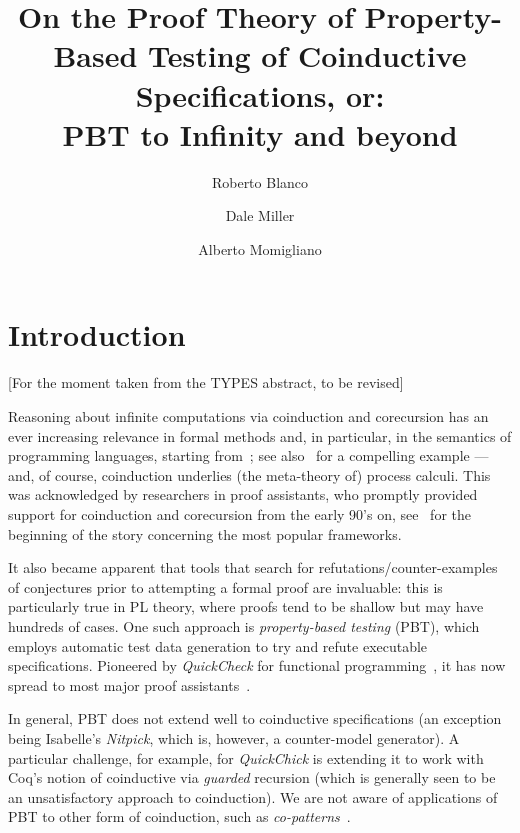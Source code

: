 \documentclass[a4paper]{easychair}
\title{On the Proof Theory of Property-Based Testing of Coinductive Specifications, or:\\
 PBT to Infinity and beyond}
\author{Roberto Blanco\inst{1} \and Dale Miller\inst{2} \and Alberto Momigliano\inst{3}}
\institute{
  INRIA Paris, France
  \and
  INRIA Saclay \& LIX, \'Ecole Polytechnique, France\\
\and
DI, Universit\`a degli Studi di Milano, Italy
}
\begin{document}
\maketitle

\section{Introduction}
\label{sec:intro}

\begin{center}
  [For the moment taken from the TYPES abstract, to be revised]
\end{center}

Reasoning about infinite computations via coinduction and corecursion
has an ever increasing relevance in formal methods and, in particular,
in the semantics of programming languages, starting
from~\cite{milner91tcs}; see also~\cite{2007-Leroy-Grall} for a
compelling example --- and, of course, coinduction underlies (the
meta-theory of) process calculi. This was acknowledged by researchers
in proof assistants, who promptly provided support for coinduction and
corecursion from the early 90's on, see~\cite{Paulson97,Gim95types}
for the beginning of the story concerning the most popular frameworks.

It also became apparent that tools that search for
refutations/counter-examples of conjectures prior to attempting a
formal proof are invaluable: this is particularly true in PL theory,
where proofs tend to be shallow but may have hundreds of cases.  One
such approach is \emph{property-based testing} (PBT), which employs
automatic test data generation to try and refute executable
specifications.  Pioneered by \emph{QuickCheck} for functional
programming~\cite{claessen00icfp}, it has now spread to most major
proof assistants~\cite{BlanchetteBN11,QChick}.


In general, PBT does not extend well to coinductive specifications
(an exception being Isabelle's \emph{Nitpick},
which is, however, a counter-model generator).  A particular
challenge, for example, for \emph{QuickChick} is extending it to work
with Coq's notion of coinductive via \emph{guarded} recursion (which
is generally seen to be an unsatisfactory approach to coinduction). We
are not aware of applications of PBT to other form of coinduction, such as \emph{co-patterns}~\cite{AbelPTS13}.
\end{document}
